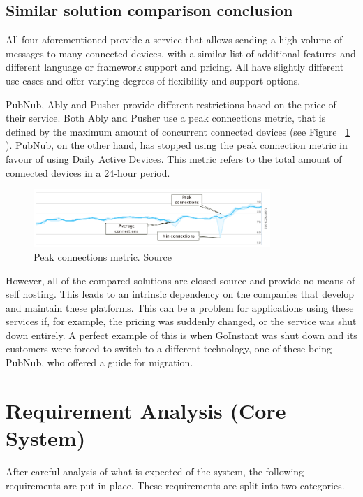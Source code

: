 \subsection{Similar solution comparison conclusion}
All four aforementioned provide a service that allows sending a high volume of messages to many connected devices, with a similar list of additional features and different language or framework support and pricing. All have slightly different use cases and offer varying degrees of flexibility and support options.

PubNub, Ably and Pusher provide different restrictions based on the price of their service. Both Ably and Pusher use a peak connections metric, that is defined by the maximum amount of concurrent connected devices (see Figure ~\ref{fig:peak-conns} ). PubNub, on the other hand, has stopped using the peak connection metric\cite{pubnub-peak} in favour of using Daily Active Devices. This metric refers to the total amount of connected devices in a 24-hour period.

\begin{figure}[!ht]
	\centering
	\includegraphics[width=0.8\textwidth]{figures/02_analysis/peak-conns}
    \caption{Peak connections metric. Source\cite{ably-peak}}
    \label{fig:peak-conns}
\end{figure}

However, all of the compared solutions are closed source and provide no means of self hosting. This leads to an intrinsic dependency on the companies that develop and maintain these platforms. This can be a problem for applications using these services if, for example, the pricing was suddenly changed, or the service was shut down entirely. A perfect example of this is when GoInstant was shut down and its customers were forced to switch to a different technology, one of these being PubNub, who offered a guide for migration\cite{pubnub-goinstant}.

\section{Requirement Analysis (Core System)}

After careful analysis of what is expected of the system, the following requirements are put in place. These requirements are split into two categories.

